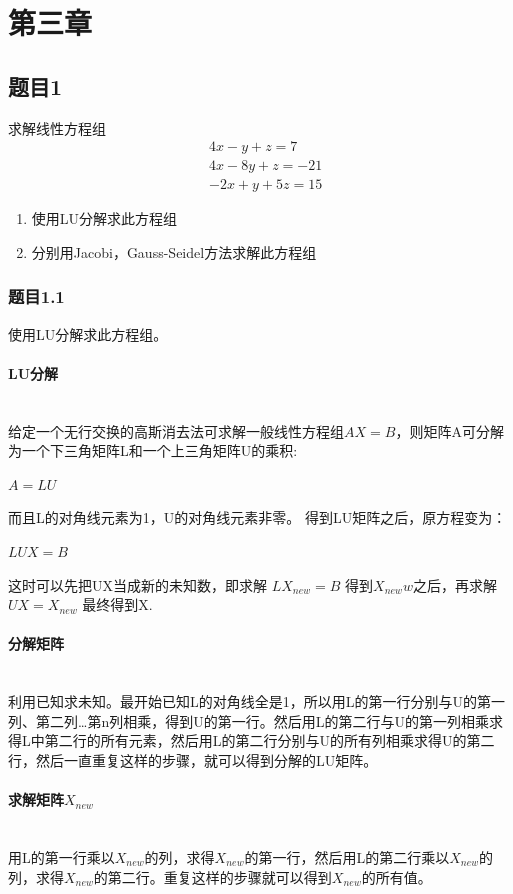 \section{第三章}

\subsection{题目1}

求解线性方程组
\begin{align}
	&4x-y+z=7\\
	&4x-8y+z=-21\\
	&-2x+y+5z=15
\end{align}

\begin{enumerate}
	\item 使用LU分解求此方程组
	\item 分别用Jacobi，Gauss-Seidel方法求解此方程组
\end{enumerate}

\subsubsection{题目1.1}

使用LU分解求此方程组。

\paragraph{LU分解}
~\\
给定一个无行交换的高斯消去法可求解一般线性方程组$AX=B$，则矩阵A可分解为一个下三角矩阵L和一个上三角矩阵U的乘积:
\begin{center}
	$A=LU$ 
\end{center}
而且L的对角线元素为1，U的对角线元素非零。
得到LU矩阵之后，原方程变为：
\begin{center}
	$LUX=B$ 
\end{center}
这时可以先把UX当成新的未知数，即求解
$LX_{new}=B$
得到$X_{new}w$之后，再求解
$UX=X_{new}$
最终得到X.

\paragraph{分解矩阵}
~\\
利用已知求未知。最开始已知L的对角线全是1，所以用L的第一行分别与U的第一列、第二列…第n列相乘，得到U的第一行。然后用L的第二行与U的第一列相乘求得L中第二行的所有元素，然后用L的第二行分别与U的所有列相乘求得U的第二行，然后一直重复这样的步骤，就可以得到分解的LU矩阵。
\paragraph{求解矩阵$X_{new}$}
~\\
用L的第一行乘以$X_{new}$的列，求得$X_{new}$的第一行，然后用L的第二行乘以$X_{new}$的列，求得$X_{new}$的第二行。重复这样的步骤就可以得到$X_{new}$的所有值。
